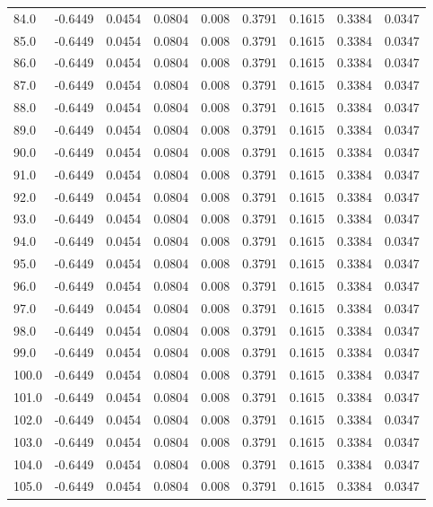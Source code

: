 \begin{longtable}{lrrrrrrrr}
84.0 & -0.6449 & 0.0454 & 0.0804 & 0.008 & 0.3791 & 0.1615 & 0.3384 & 0.0347 \\
85.0 & -0.6449 & 0.0454 & 0.0804 & 0.008 & 0.3791 & 0.1615 & 0.3384 & 0.0347 \\
86.0 & -0.6449 & 0.0454 & 0.0804 & 0.008 & 0.3791 & 0.1615 & 0.3384 & 0.0347 \\
87.0 & -0.6449 & 0.0454 & 0.0804 & 0.008 & 0.3791 & 0.1615 & 0.3384 & 0.0347 \\
88.0 & -0.6449 & 0.0454 & 0.0804 & 0.008 & 0.3791 & 0.1615 & 0.3384 & 0.0347 \\
89.0 & -0.6449 & 0.0454 & 0.0804 & 0.008 & 0.3791 & 0.1615 & 0.3384 & 0.0347 \\
90.0 & -0.6449 & 0.0454 & 0.0804 & 0.008 & 0.3791 & 0.1615 & 0.3384 & 0.0347 \\
91.0 & -0.6449 & 0.0454 & 0.0804 & 0.008 & 0.3791 & 0.1615 & 0.3384 & 0.0347 \\
92.0 & -0.6449 & 0.0454 & 0.0804 & 0.008 & 0.3791 & 0.1615 & 0.3384 & 0.0347 \\
93.0 & -0.6449 & 0.0454 & 0.0804 & 0.008 & 0.3791 & 0.1615 & 0.3384 & 0.0347 \\
94.0 & -0.6449 & 0.0454 & 0.0804 & 0.008 & 0.3791 & 0.1615 & 0.3384 & 0.0347 \\
95.0 & -0.6449 & 0.0454 & 0.0804 & 0.008 & 0.3791 & 0.1615 & 0.3384 & 0.0347 \\
96.0 & -0.6449 & 0.0454 & 0.0804 & 0.008 & 0.3791 & 0.1615 & 0.3384 & 0.0347 \\
97.0 & -0.6449 & 0.0454 & 0.0804 & 0.008 & 0.3791 & 0.1615 & 0.3384 & 0.0347 \\
98.0 & -0.6449 & 0.0454 & 0.0804 & 0.008 & 0.3791 & 0.1615 & 0.3384 & 0.0347 \\
99.0 & -0.6449 & 0.0454 & 0.0804 & 0.008 & 0.3791 & 0.1615 & 0.3384 & 0.0347 \\
100.0 & -0.6449 & 0.0454 & 0.0804 & 0.008 & 0.3791 & 0.1615 & 0.3384 & 0.0347 \\
101.0 & -0.6449 & 0.0454 & 0.0804 & 0.008 & 0.3791 & 0.1615 & 0.3384 & 0.0347 \\
102.0 & -0.6449 & 0.0454 & 0.0804 & 0.008 & 0.3791 & 0.1615 & 0.3384 & 0.0347 \\
103.0 & -0.6449 & 0.0454 & 0.0804 & 0.008 & 0.3791 & 0.1615 & 0.3384 & 0.0347 \\
104.0 & -0.6449 & 0.0454 & 0.0804 & 0.008 & 0.3791 & 0.1615 & 0.3384 & 0.0347 \\
105.0 & -0.6449 & 0.0454 & 0.0804 & 0.008 & 0.3791 & 0.1615 & 0.3384 & 0.0347 \\

\end{longtable}
